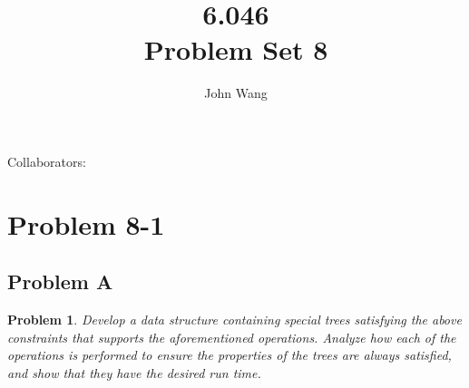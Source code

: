 \documentclass[psamsfonts]{amsart}
\title{6.046 \\
Problem Set 8}
\author{John Wang}
\newtheorem{prob}{Problem}[section]
\theoremstyle{definition}
\theoremstyle{remark}
\numberwithin{equation}{section}
\begin{document}
\maketitle

Collaborators: 

\section{Problem 8-1}

\subsection{Problem A}

\begin{prob}
Develop a data structure containing special trees satisfying the above constraints that supports the aforementioned operations. Analyze how each of the operations is performed to ensure the properties of the trees are always satisfied, and show that they have the desired run time. 
\end{prob}
\end{document}
